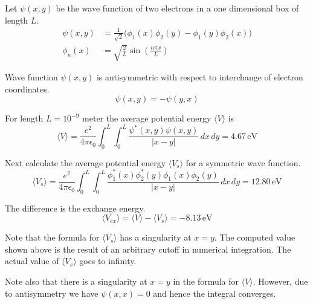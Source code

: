 \documentclass[12pt]{article}
\begin{document}
\noindent
Let $\psi(x,y)$ be the wave function of two electrons in a one dimensional box of length $L$.
\begin{align*}
\psi(x,y)&=\frac{1}{\sqrt{2}}
\big(\phi_1(x)\phi_2(y)-\phi_1(y)\phi_2(x)\big)
\\[2ex]
\phi_n(x)&=\sqrt{\frac{2}{L}}\sin\left(\frac{n\pi x}{L}\right)
\end{align*}

\noindent
Wave function $\psi(x,y)$ is antisymmetric with respect to interchange of electron coordinates.
\begin{equation*}
\psi(x,y)=-\psi(y,x)
\end{equation*}

\noindent
For length $L=10^{-9}$ meter the average potential energy $\langle V\rangle$ is
\begin{equation*}
\langle V\rangle=\frac{e^2}{4\pi\epsilon_0}\int_0^L\int_0^L\frac{\psi^*(x,y)\psi(x,y)}{|x-y|}\,dx\,dy
=4.67\,\text{eV}
\end{equation*}

\noindent
Next calculate the average potential energy $\langle V_s\rangle$ for a symmetric wave function.
\begin{equation*}
\langle V_s\rangle=\frac{e^2}{4\pi\epsilon_0}
\int_0^L\int_0^L\frac{\phi_1^*(x)\phi_2^*(y)\phi_1(x)\phi_2(y)}{|x-y|}\,dx\,dy
=12.80\,\text{eV}
\end{equation*}

\noindent
The difference is the exchange energy.
\begin{equation*}
\langle V_{ex}\rangle=\langle V\rangle-\langle V_s\rangle=-8.13\,\text{eV}
\end{equation*}

\noindent
Note that the formula for $\langle V_s\rangle$ has a singularity at $x=y$.
The computed value shown above is the result of an arbitrary cutoff in numerical integration.
The actual value of $\langle V_s\rangle$ goes to infinity.

\bigskip
\noindent
Note also that there is a singularity at $x=y$ in the formula for $\langle V\rangle$.
However, due to antisymmetry we have $\psi(x,x)=0$ and hence the integral converges.
\end{document}
